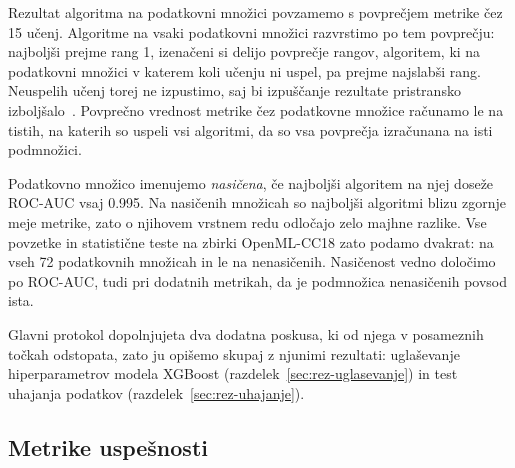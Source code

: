 \documentclass[a4paper,12pt,openright]{book}
\begin{document}
Rezultat algoritma na podatkovni množici povzamemo s povprečjem metrike čez 15
učenj. Algoritme na vsaki podatkovni množici razvrstimo po tem povprečju:
najboljši prejme rang 1, izenačeni si delijo povprečje rangov, algoritem, ki na
podatkovni množici v katerem koli učenju ni uspel, pa prejme najslabši rang.
Neuspelih učenj torej ne izpustimo, saj bi izpuščanje rezultate pristransko
izboljšalo~\cite{wainberg2016random}. Povprečno vrednost metrike čez podatkovne
množice računamo le na tistih, na katerih so uspeli vsi algoritmi, da so vsa
povprečja izračunana na isti podmnožici.

Podatkovno množico imenujemo \emph{nasičena}, če najboljši algoritem na njej
doseže ROC-AUC vsaj \num{0.995}. Na nasičenih množicah so najboljši algoritmi
blizu zgornje meje metrike, zato o njihovem vrstnem redu odločajo zelo majhne
razlike. Vse povzetke in statistične teste na zbirki OpenML-CC18 zato podamo
dvakrat: na vseh 72 podatkovnih množicah in le na nenasičenih. Nasičenost vedno določimo po ROC-AUC, tudi pri
dodatnih metrikah, da je podmnožica nenasičenih povsod ista.

Glavni protokol dopolnjujeta dva dodatna poskusa, ki od njega v posameznih
točkah odstopata, zato ju opišemo skupaj z njunimi rezultati: uglaševanje
hiperparametrov modela XGBoost (razdelek~\ref{sec:rez-uglasevanje}) in test
uhajanja podatkov (razdelek~\ref{sec:rez-uhajanje}).

\subsection{Metrike uspešnosti}
\label{sec:metrike}
\end{document}
